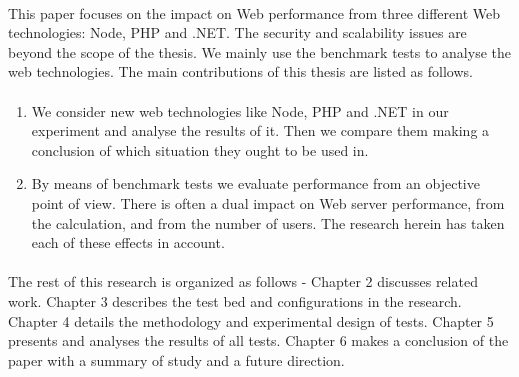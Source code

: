 \documentclass[../thesis.tex]{subfiles}
\begin{document}
\paragraph{}
This paper focuses on the impact on Web performance from three different Web technologies: Node, PHP and .NET. The security and scalability issues are beyond the scope of the thesis. We mainly use the benchmark tests to analyse the web technologies. The main contributions of this thesis are listed as follows. 
\paragraph{}
\begin{enumerate}
    \item We consider new web technologies like Node, PHP and .NET in our experiment and analyse the results of it. Then we compare them making a conclusion of which situation they ought to be used in. 
    \item By means of benchmark tests we evaluate performance from an objective point of view. There is often a dual impact on Web server performance, from the calculation, and from the number of users. The research herein has taken each of these effects in account.
\end{enumerate} 
\paragraph{}

The rest of this research is organized as follows - Chapter 2 discusses related work. Chapter 3 describes the test bed and configurations in the research. Chapter 4 details the methodology and experimental design of tests. Chapter 5 presents and analyses the results of all tests. Chapter 6 makes a conclusion of the paper with a summary of study and a future direction.
\end{document}

